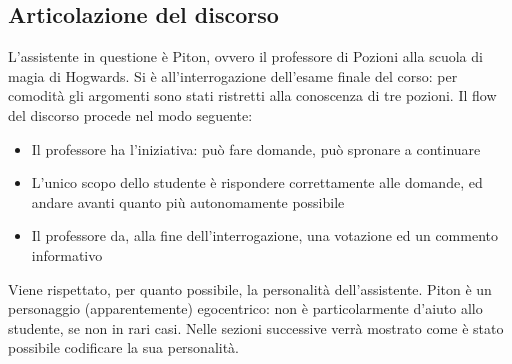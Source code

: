\subsection{Articolazione del discorso}
L'assistente in questione è Piton, ovvero il professore di Pozioni alla scuola di magia di Hogwards. Si è all'interrogazione dell'esame finale del corso: per comodità gli argomenti sono stati ristretti alla conoscenza di tre pozioni. Il flow del discorso procede nel modo seguente:
\begin{itemize}
    \item Il professore ha l'iniziativa: può fare domande, può spronare a continuare
    \item L'unico scopo dello studente è rispondere correttamente alle domande, ed andare avanti quanto più autonomamente possibile
    \item Il professore da, alla fine dell'interrogazione, una votazione ed un commento informativo
\end{itemize}
Viene rispettato, per quanto possibile, la personalità dell'assistente. Piton è un personaggio (apparentemente) egocentrico: non è particolarmente d'aiuto allo studente, se non in rari casi. Nelle sezioni successive verrà mostrato come è stato possibile codificare la sua personalità.


